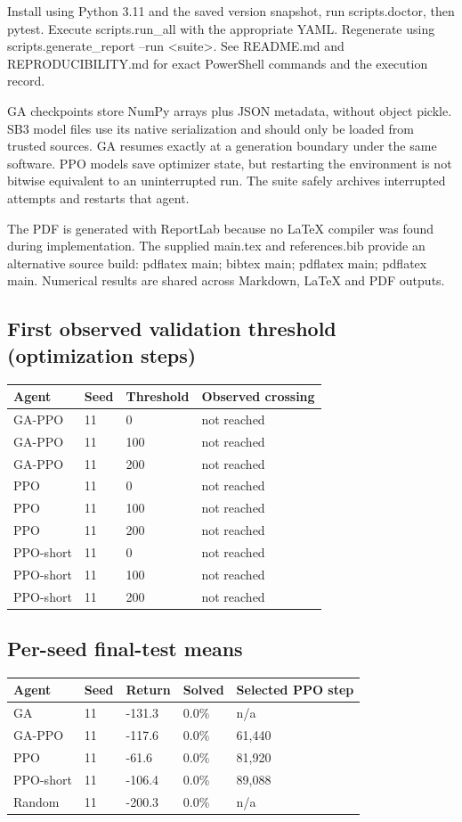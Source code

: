 \documentclass[11pt,a4paper]{article}
\begin{document}
Install using Python 3.11 and the saved version snapshot, run scripts.doctor, then pytest. Execute scripts.run\_all with the appropriate YAML. Regenerate using scripts.generate\_report --run <suite>. See README.md and REPRODUCIBILITY.md for exact PowerShell commands and the execution record.

GA checkpoints store NumPy arrays plus JSON metadata, without object pickle. SB3 model files use its native serialization and should only be loaded from trusted sources. GA resumes exactly at a generation boundary under the same software. PPO models save optimizer state, but restarting the environment is not bitwise equivalent to an uninterrupted run. The suite safely archives interrupted attempts and restarts that agent.

The PDF is generated with ReportLab because no LaTeX compiler was found during implementation. The supplied main.tex and references.bib provide an alternative source build: pdflatex main; bibtex main; pdflatex main; pdflatex main. Numerical results are shared across Markdown, LaTeX and PDF outputs.

\subsection*{First observed validation threshold (optimization steps)}
\begingroup\small
\begin{longtable}{p{}p{}p{}p{}}
\toprule
Agent & Seed & Threshold & Observed crossing \\
\midrule\endhead
GA-PPO & 11 & 0 & not reached \\
GA-PPO & 11 & 100 & not reached \\
GA-PPO & 11 & 200 & not reached \\
PPO & 11 & 0 & not reached \\
PPO & 11 & 100 & not reached \\
PPO & 11 & 200 & not reached \\
PPO-short & 11 & 0 & not reached \\
PPO-short & 11 & 100 & not reached \\
PPO-short & 11 & 200 & not reached \\
\bottomrule\end{longtable}
\endgroup
\subsection*{Per-seed final-test means}
\begingroup\small
\begin{longtable}{p{}p{}p{}p{}p{}}
\toprule
Agent & Seed & Return & Solved & Selected PPO step \\
\midrule\endhead
GA & 11 & -131.3 & 0.0\% & n/a \\
GA-PPO & 11 & -117.6 & 0.0\% & 61,440 \\
PPO & 11 & -61.6 & 0.0\% & 81,920 \\
PPO-short & 11 & -106.4 & 0.0\% & 89,088 \\
Random & 11 & -200.3 & 0.0\% & n/a \\
\bottomrule\end{longtable}
\endgroup
\end{document}
